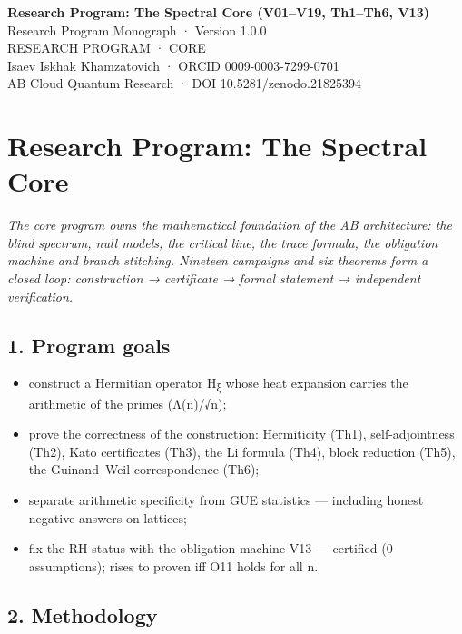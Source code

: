 \documentclass[11pt,a4paper]{article}
\begin{document}
\begin{center}
{\LARGE\bfseries Research Program: The Spectral Core (V01–V19, Th1–Th6, V13)}\\[8pt]
{\large Research Program Monograph · Version 1.0.0}\\[6pt]
{\color{copper}\small RESEARCH PROGRAM · CORE}\\[4pt]
{\small Isaev Iskhak Khamzatovich · ORCID 0009-0003-7299-0701}\\[2pt]
{\small AB Cloud Quantum Research · DOI 10.5281/zenodo.21825394}
\end{center}

\tableofcontents
\newpage

\section{Research Program: The Spectral Core}

\noindent\textit{\color{copper}The core program owns the mathematical foundation of the AB architecture: the blind spectrum, null models, the critical line, the trace formula, the obligation machine and branch stitching. Nineteen campaigns and six theorems form a closed loop: construction → certificate → formal statement → independent verification.}

\subsection{1. Program goals}

\begin{itemize}
  \item construct a Hermitian operator H\textsubscript{ξ} whose heat expansion carries the arithmetic of the primes (Λ(n)/√n);
  \item prove the correctness of the construction: Hermiticity (Th1), self-adjointness (Th2), Kato certificates (Th3), the Li formula (Th4), block reduction (Th5), the Guinand–Weil correspondence (Th6);
  \item separate arithmetic specificity from GUE statistics — including honest negative answers on lattices;
  \item fix the RH status with the obligation machine V13 — certified (0 assumptions); rises to proven iff O11 holds for all n.
\end{itemize}

\subsection{2. Methodology}
\end{document}
